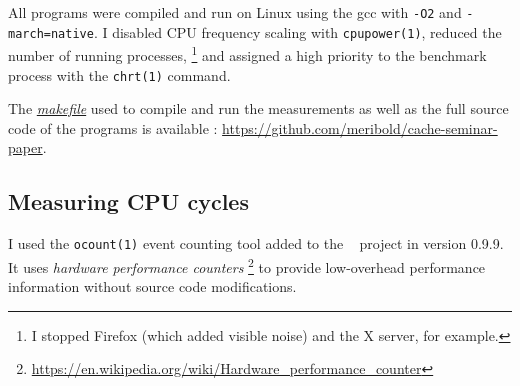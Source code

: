\begin{comment}
General mitigation/alleviation strategy: take the minimum execution time of \alts{all, a
number of} runs; all noise is additive (TODO: not the one caused by the cache being hot).
\end{comment}

All programs were compiled and run on Linux using the \gls{gcc} with
\texttt{-O2} and \texttt{-march=native}.
I disabled CPU frequency scaling with \texttt{cpupower(1)},
reduced the number of running processes,%
\footnote{%
   I stopped Firefox (which added visible noise) and the X server, for example.
}
and assigned a high priority to the benchmark process with the \texttt{chrt(1)}
command.

The \emph{\href{https://github.com/meribold/cache-seminar-paper/blob/master/makefile}
{makefile}} used to compile and run the measurements as well as the full source code of
the programs is available :
\url{https://github.com/meribold/cache-seminar-paper}.

\subsection{Measuring CPU cycles}
\label{app:cycles}





I used the \texttt{ocount(1)} event counting tool added to the
~\cite{oprofile} project in version 0.9.9.
%
It uses \emph{hardware performance counters}%
\footnote{%
   \url{https://en.wikipedia.org/wiki/Hardware_performance_counter}
}
to provide low-overhead performance information without source code modifications.

